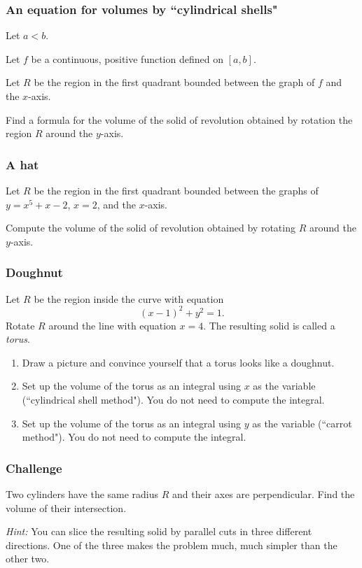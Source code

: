 \begin{frame}[t]
	\frametitle{An equation for volumes by ``cylindrical shells"}

	Let $a < b$.

	Let $f$ be a continuous, positive function defined on $[a,b]$.

	Let $R$ be the region in the first quadrant bounded between the graph of $f$ and
	the $x$-axis.

	Find a formula for the volume of the solid of revolution obtained by rotation the
	region $R$ around the $y$-axis.
\end{frame}

\begin{frame}[t]
	\frametitle{A hat}

	Let $R$ be the region in the first quadrant bounded between the graphs of
	$\displaystyle y=x^{5}+x-2$, $\displaystyle x=2$, and the $\displaystyle x$-axis.

	Compute the volume of the solid of revolution obtained by rotating $R$ around
	the $y$-axis.
\end{frame}

\begin{frame}[t]
	\fontsize{13}{13}\selectfont
	\frametitle{Doughnut}

	Let $R$ be the region inside the curve with equation
	\[
		(x-1)^{2}+ y^{2}=1.
	\]
	Rotate $R$ around the line with equation $\displaystyle x=4$. The resulting
	solid is called a \emph{torus}.

	\begin{enumerate}
		\item Draw a picture and convince yourself that a torus looks like a doughnut.

		\item Set up the volume of the torus as an integral using $x$ as the variable
			(``cylindrical shell method"). You do not need to compute the integral.

		\item Set up the volume of the torus as an integral using $y$ as the variable
			(``carrot method"). You do not need to compute the integral.
	\end{enumerate}
\end{frame}

\begin{frame}[t]
	\frametitle{Challenge}

	Two cylinders have the same radius $R$ and their axes are perpendicular. Find the
	volume of their intersection.

	\emph{Hint:} You can slice the resulting solid by parallel cuts in three
	different directions. One of the three makes the problem much, much simpler
	than the other two.
\end{frame}

